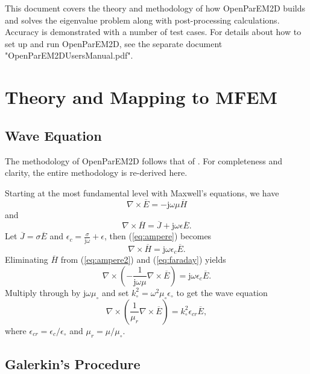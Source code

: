 \documentclass[titlepage]{article}
\renewcommand\_{\textunderscore\linebreak[1]}
\begin{document}
This document covers the theory and methodology of how OpenParEM2D builds and solves the eigenvalue problem along with post-processing calculations.  Accuracy is demonstrated with a number of test cases.  For details about how to set up and run OpenParEM2D, see the separate document "OpenParEM2D\_Users\_Manual.pdf".

\section{Theory and Mapping to MFEM}

\subsection{Wave Equation}

The methodology of OpenParEM2D follows that of \cite{Lee}.  For completeness and clarity, the entire methodology is re-derived here. 

Starting at the most fundamental level with Maxwell's equations, we have
\begin{equation}
\label{eq:faraday}
\nabla\times\overline{E}=-\text{j}\omega\mu\overline{H}
\end{equation}
and
\begin{equation}
\label{eq:ampere}
\nabla\times\overline{H}=\overline{J}+\text{j}\omega\epsilon\overline{E}.
\end{equation}
Let $\overline{J}=\sigma\overline{E}$ and $\epsilon_c=\frac{\sigma}{\text{j}\omega}+\epsilon$, then (\ref{eq:ampere}) becomes
\begin{equation}
\label{eq:ampere2}
\nabla\times\overline{H}=\text{j}\omega\epsilon_c\overline{E}.
\end{equation}
Eliminating $\overline{H}$ from (\ref{eq:ampere2}) and (\ref{eq:faraday}) yields 
\begin{equation}
\nabla\times(-\frac{1}{\text{j}\omega\mu}\nabla\times\overline{E})=\text{j}\omega\epsilon_c\overline{E}.
\end{equation}
Multiply through by $\text{j}\omega\mu_\circ$ and set $k_\circ^2=\omega^2\mu_\circ\epsilon_\circ$ to get the wave equation
\begin{equation}
\label{eq:wave_equation}
\nabla\times(\frac{1}{\mu_r}\nabla\times\overline{E})=k_\circ^2\epsilon_{cr}\overline{E},
\end{equation}
where $\epsilon_{cr}=\epsilon_c/\epsilon_\circ$ and $\mu_r=\mu/\mu_{\circ}$.

\subsection{Galerkin's Procedure}
\end{document}
